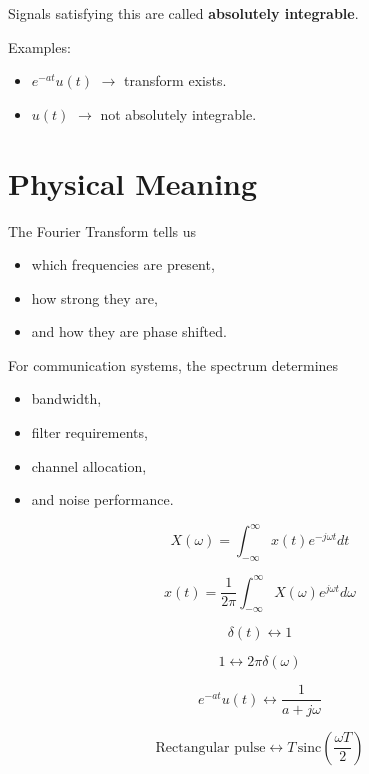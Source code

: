 Signals satisfying this are called \textbf{absolutely integrable}.

Examples:

\begin{itemize}
\item \(e^{-at}u(t)\) \(\rightarrow\) transform exists.
\item \(u(t)\) \(\rightarrow\) not absolutely integrable.
\end{itemize}


\section{Physical Meaning}

The Fourier Transform tells us

\begin{itemize}
\item which frequencies are present,
\item how strong they are,
\item and how they are phase shifted.
\end{itemize}

For communication systems, the spectrum determines

\begin{itemize}
\item bandwidth,
\item filter requirements,
\item channel allocation,
\item and noise performance.
\end{itemize}


\begin{tcolorbox}[title=Quick Recall,colback=yellow!10]

\[
X(\omega)=
\int_{-\infty}^{\infty}
x(t)e^{-j\omega t}dt
\]

\[
x(t)=
\frac{1}{2\pi}
\int_{-\infty}^{\infty}
X(\omega)e^{j\omega t}d\omega
\]

\[
\delta(t)\leftrightarrow 1
\]

\[
1\leftrightarrow 2\pi\delta(\omega)
\]

\[
e^{-at}u(t)\leftrightarrow \frac{1}{a+j\omega}
\]

\[
\text{Rectangular pulse}\leftrightarrow T\,\mathrm{sinc}\left(\frac{\omega T}{2}\right)
\]

\end{tcolorbox}
